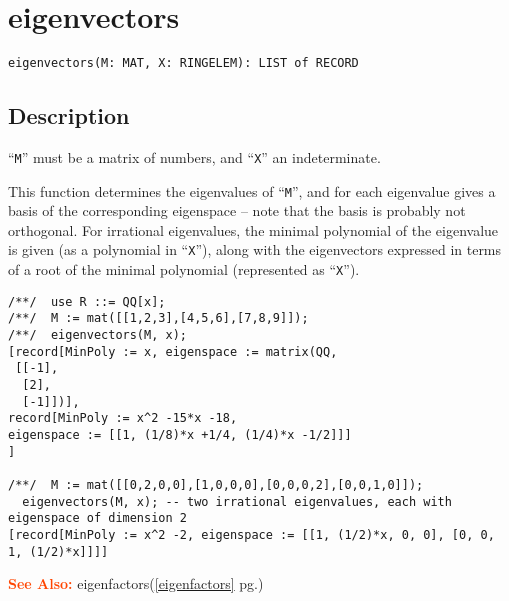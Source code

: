 \documentclass[a4paper]{mybook}
\newenvironment{command}{}{} %
\newcommand\SeeAlso{\par\textcolor{OrangeRed}{\textbf{\large See Also: }}}
\begin{document}
\section{eigenvectors}
\label{eigenvectors}
\begin{command} %


\begin{Verbatim}[label=syntax, rulecolor=\color{MidnightBlue},
frame=single]
eigenvectors(M: MAT, X: RINGELEM): LIST of RECORD
\end{Verbatim}


\subsection*{Description}

``\verb&M&'' must be a matrix of numbers, and ``\verb&X&'' an indeterminate.
\par 
This function determines the eigenvalues of ``\verb&M&'', and for each eigenvalue
gives a basis of the corresponding eigenspace -- note that the basis is
probably not orthogonal.  For irrational eigenvalues, the minimal
polynomial of the eigenvalue is given (as a polynomial in ``\verb&X&''), along with
the eigenvectors expressed in terms of a root of the minimal polynomial
(represented as ``\verb&X&'').
\begin{Verbatim}[label=example, rulecolor=\color{PineGreen}, frame=single]
/**/  use R ::= QQ[x];
/**/  M := mat([[1,2,3],[4,5,6],[7,8,9]]);
/**/  eigenvectors(M, x);
[record[MinPoly := x, eigenspace := matrix(QQ,
 [[-1],
  [2],
  [-1]])],
record[MinPoly := x^2 -15*x -18,
eigenspace := [[1, (1/8)*x +1/4, (1/4)*x -1/2]]]
]

/**/  M := mat([[0,2,0,0],[1,0,0,0],[0,0,0,2],[0,0,1,0]]);
  eigenvectors(M, x); -- two irrational eigenvalues, each with eigenspace of dimension 2
[record[MinPoly := x^2 -2, eigenspace := [[1, (1/2)*x, 0, 0], [0, 0, 1, (1/2)*x]]]]
\end{Verbatim}


\SeeAlso %
  eigenfactors(\ref{eigenfactors} pg.\pageref{eigenfactors})
\end{command} %
\end{document}
